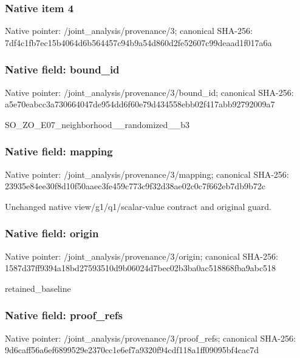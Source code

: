\documentclass[10pt,a4paper]{article}
\begin{document}
\subsubsection{Native item 4}
Native pointer: /joint\_\allowbreak{}analysis/provenance/3; canonical SHA-256: 7df4c1fb7ec15b4064d6b564457c94b9a54d860d2fe52607c99deaad1f017a6a

\subsubsection{Native field: bound\_\allowbreak{}id}
Native pointer: /joint\_\allowbreak{}analysis/provenance/3/bound\_\allowbreak{}id; canonical SHA-256: a5e70eabcc3a730664047de954dd6f60e79d434558ebb02f417abb92792009a7

\begingroup\raggedright\sloppy SO\_\allowbreak{}ZO\_\allowbreak{}E07\_\allowbreak{}neighborhood\_\allowbreak{}\_\allowbreak{}randomized\_\allowbreak{}\_\allowbreak{}b3\par\endgroup

\subsubsection{Native field: mapping}
Native pointer: /joint\_\allowbreak{}analysis/provenance/3/mapping; canonical SHA-256: 23935e84ee30f8d10f50aaec3fe459c773c9f32d38ae02c0c7f662eb7db9b72c

\begingroup\raggedright\sloppy Unchanged native view/\allowbreak{}g1/\allowbreak{}q1/\allowbreak{}scalar-value contract and original guard.\par\endgroup

\subsubsection{Native field: origin}
Native pointer: /joint\_\allowbreak{}analysis/provenance/3/origin; canonical SHA-256: 1587d37ff9394a18bd27593510d9b06024d7bec02b3ba0ac518868fba9abc518

\begingroup\raggedright\sloppy retained\_\allowbreak{}baseline\par\endgroup

\subsubsection{Native field: proof\_\allowbreak{}refs}
Native pointer: /joint\_\allowbreak{}analysis/provenance/3/proof\_\allowbreak{}refs; canonical SHA-256: 9d6caff56a6ef6899529e2370cc1e6ef7a9320f94cdf118a1ff09095bf4cac7d
\end{document}
